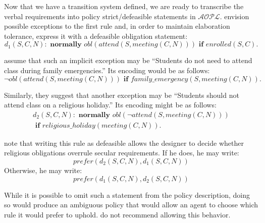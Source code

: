 
Now that we have a transition system defined, we are ready to transcribe the verbal requirements into policy strict/defeasible statements in $\mathcal{AOPL}$.
\citet{gelfond_authorization_2008} envision possible exceptions to the first rule and, in order to maintain elaboration tolerance, express it with a defeasible obligation statement:
\begin{equation}
    \label{eq:aopl_example_line_1}
    d_1(S,C,N): \textbf{ normally } obl(attend(S, meeting(C, N))) \textbf{ if } enrolled(S, C).
\end{equation}

\citet{gelfond_authorization_2008} assume that such an implicit exception may be ``Students do not need to attend class during family emergencies.''
Its encoding would be as follows:
\begin{equation}
    \label{eq:aopl_example_line_2}
    \neg obl(attend(S,meeting(C, N))) \textbf{ if } family\_emergency(S,meeting(C, N)).
\end{equation}

Similarly, they suggest that another exception may be ``Students should not attend class on a religious holiday.''
Its encoding might be as follows:
\begin{multline}
    \label{eq:aopl_example_line_3}
    d_2(S,C,N): \textbf{ normally } obl(\neg attend(S, meeting(C, N))) \\
        \textbf{ if } religious\_holiday(meeting(C, N)).
\end{multline}

\citet{gelfond_authorization_2008} note that writing this rule as defeasible allows the designer to decide whether religious obligations overrule secular requirements.
If he does, he may write:
\begin{equation}
    \label{eq:aopl_example_line_4}
    prefer(d_2(S,C,N),d_1(S,C,N))
\end{equation}
Otherwise, he may write:
\begin{equation}
    \label{eq:aopl_example_line_5}
    prefer(d_1(S,C,N), d_2(S,C,N))
\end{equation}

While it is possible to omit such a statement from the policy description, doing so would produce an ambiguous policy that would allow an agent to choose which rule it would prefer to uphold.
\citet{gelfond_authorization_2008} do not recommend allowing this behavior.

